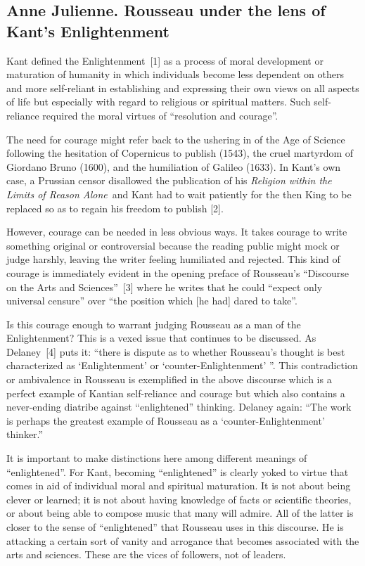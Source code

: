
\subsection*{Anne Julienne. Rousseau under the lens of Kant’s Enlightenment}

\begin{multicols}{2}
Kant defined the Enlightenment~[1] as a process of moral development or maturation of humanity in which individuals
become less dependent on others and more self-reliant in establishing and expressing their own views on all aspects of life but
especially with regard to religious or spiritual matters. Such self-reliance required the moral virtues of ``resolution and
courage''.

The need for courage might refer back to the ushering in of the Age of Science following the hesitation of Copernicus to
publish (1543), the cruel martyrdom of Giordano Bruno (1600), and the humiliation of Galileo (1633). In Kant’s own case, a
Prussian censor disallowed the publication of his \emph{Religion within the Limits of Reason Alone}\ and Kant had to wait patiently for
the then King to be replaced so as to regain his freedom to publish [2].

However, courage can be needed in less obvious ways. It takes courage to write something original or controversial because
the reading public might mock or judge harshly, leaving the writer feeling humiliated and rejected. This kind of courage is
immediately evident in the opening preface of Rousseau’s ``Discourse on the Arts and Sciences''~[3] where he writes that he
could ``expect only universal censure'' over ``the position which [he had] dared to take''.

Is this courage enough to warrant judging Rousseau as a man of the Enlightenment? This is a vexed issue that continues to be
discussed. As Delaney~[4] puts it: ``there is dispute as to whether Rousseau’s thought is best characterized as ‘Enlightenment’
or ‘counter-Enlightenment’ ''. This contradiction or ambivalence in Rousseau is exemplified in the above discourse which is a
perfect example of Kantian self-reliance and courage but which also contains a never-ending diatribe against ``enlightened''
thinking. Delaney again: ``The work is perhaps the greatest example of Rousseau as a ‘counter-Enlightenment’ thinker.''

It is important to make distinctions here among different meanings of ``enlightened''. For Kant, becoming ``enlightened'' is
clearly yoked to virtue that comes in aid of individual moral and spiritual maturation. It is not about being clever or learned; it
is not about having knowledge of facts or scientific theories, or about being able to compose music that many will admire. All
of the latter is closer to the sense of ``enlightened'' that Rousseau uses in this discourse. He is attacking a certain sort of vanity
and arrogance that becomes associated with the arts and sciences. These are the vices of followers, not of leaders.


\end{multicols}
